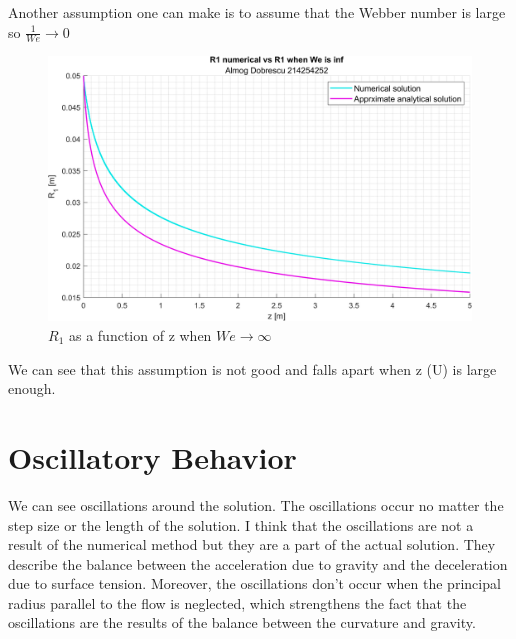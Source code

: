 \documentclass[11pt, a4paper]{article}
\begin{document}
Another assumption one can make is to assume that the Webber number is large so $\frac{1}{We}\rightarrow0$
\begin{figure}[H]
    \centering
    \includegraphics[width=1\textwidth]{images/graph4.png}
    \caption{$R_1$ as a function of z when $We\rightarrow\infty$}
    \label{fig:R_1_of_z_when_We_inf}
\end{figure}
We can see that this assumption is not good and falls apart when z (U) is large enough.

\newpage

\section{Oscillatory Behavior}
We can see oscillations around the solution. The oscillations occur no matter the step size or the length of the solution. I think that the oscillations are not a result of the numerical method but they are a part of the actual solution. They describe the balance between the acceleration due to gravity and the deceleration due to surface tension. Moreover, the oscillations don't occur when the principal radius parallel to the flow is neglected, which strengthens the fact that the oscillations are the results of the balance between the curvature and gravity.

\newpage

\appendix
\end{document}

